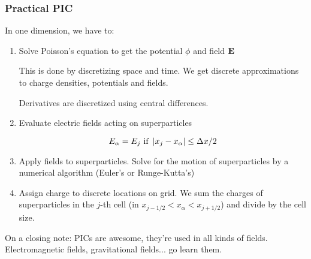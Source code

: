 \documentclass[PlasmaNotes.tex]{subfiles}
\begin{document}
\subsubsection{Practical PIC}
In one dimension, we have to:
\begin{enumerate}
\item Solve Poisson's equation to get the potential $\phi$ and field $\mathbf{E}$

This is done by discretizing space and time. We get discrete approximations to charge densities, potentials and fields.

Derivatives are discretized using central differences. 
\item Evaluate electric fields acting on superparticles

\[E_{\alpha} = E_j \text{ if } \left| x_j-x_{\alpha} \right| \leq \Delta x/2 \]

\item Apply fields to superparticles. Solve for the motion of superparticles by a numerical algorithm (Euler's or Runge-Kutta's)
\item Assign charge to discrete locations on grid. We sum the charges of superparticles in the $j$-th cell (in $x_{j-1/2} < x_{\alpha} < x_{j+1/2}$) and divide by the cell size.
\end{enumerate}


On a closing note: PICs are awesome, they're used in all kinds of fields. Electromagnetic fields, gravitational fields... go learn them. \text{:)}
\end{document}
